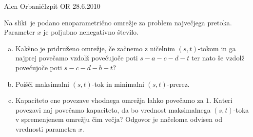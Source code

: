 \begin{naloga}{Alen Orbanić}{Izpit OR 28.6.2010}
\begin{vprasanje}
Na sliki~\fig je podano enoparametrično omrežje
za problem največjega pretoka.
Parameter $x$ je poljubno nenegativno število.

\begin{enumerate}[(a)]
\item Kakšno je pridruženo omrežje,
če začnemo z ničelnim $(s, t)$-tokom
in ga najprej povečamo vzdolž povečujoče poti $s-a-c-d-t$
ter nato še vzdolž povečujoče poti $s-c-d-b-t$?

\item Poišči maksimalni $(s, t)$-tok in minimalni $(s, t)$-prerez.

\item Kapaciteto ene povezave vhodnega omrežja lahko povečamo za $1$.
Kateri povezavi naj povečamo kapaciteto,
da bo vrednost maksimalnega $(s, t)$-toka v spremenjenem omrežju čim večja?
Odgovor je načeloma odvisen od vred\-no\-sti parametra $x$.
\end{enumerate}

\begin{slika}
\pgfslika
{}
\end{slika}
\end{vprasanje}
\begin{odgovor}
\end{odgovor}
\end{naloga}
